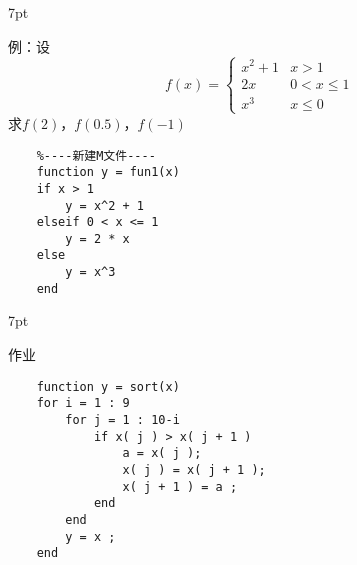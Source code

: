 \documentclass{article} %
\newenvironment{wa}{%
\def\FrameCommand{%
\hspace{1pt}%
{\color{LightCoral}\vrule width 2pt}%
{\color{washade}\vrule width 4pt}%
\colorbox{washade}%
}%
\MakeFramed{\advance\hsize-\width\FrameRestore}%
\noindent\hspace{-4.55pt}%
\begin{adjustwidth}{}{7pt}%
\vspace{2pt}\vspace{2pt}%
\normalfont %
}
{%
\vspace{2pt}\end{adjustwidth}\endMakeFramed%
}
\begin{document}
\begin{wa}
    例：设
    $$f(x) = 
    \begin{cases}
        x^{2} + 1 & x > 1\\
        2x & 0 < x \leqslant 1 \\
        x^{3} & x \leqslant 0
    \end{cases}
    $$
    \indent 求$f(2)$，$f(0.5)$，$f(-1)$
\end{wa}
\begin{lstlisting}
    %----新建M文件----
    function y = fun1(x)
    if x > 1
        y = x^2 + 1
    elseif 0 < x <= 1
        y = 2 * x
    else
        y = x^3
    end
\end{lstlisting}

\begin{wa}
    作业
\end{wa}
\begin{lstlisting}
    function y = sort(x)
    for i = 1 : 9
        for j = 1 : 10-i
            if x( j ) > x( j + 1 )
                a = x( j );
                x( j ) = x( j + 1 ); 
                x( j + 1 ) = a ;
            end
        end
        y = x ;
    end
\end{lstlisting}
\end{document}

